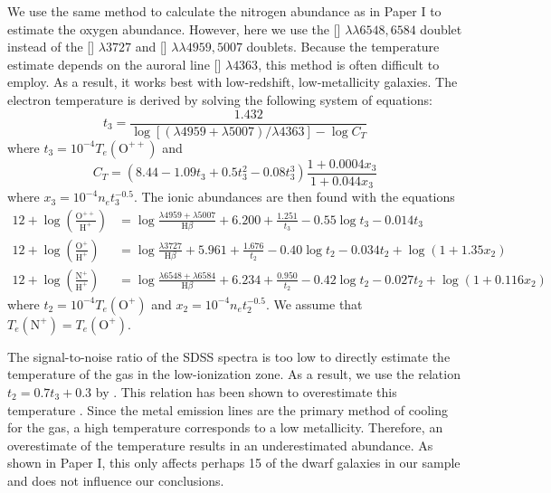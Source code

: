 We use the same method to calculate the nitrogen abundance as in Paper I to 
estimate the oxygen abundance.  However, here we use the [] 
$\lambda \lambda 6548, 6584$ doublet instead of the [] $\lambda 3727$ 
and [] $\lambda \lambda 4959,5007$ doublets.  Because the temperature 
estimate depends on the auroral line [] $\lambda 4363$, this method is 
often difficult to employ.  As a result, it works best with low-redshift, 
low-metallicity galaxies.  The electron temperature is derived by solving the 
following system of equations:
\begin{equation}
	t_3 = \frac{1.432}{\log[(\lambda 4959 + \lambda 5007)/\lambda 4363] - \log C_T}
\end{equation}
where $t_3 = 10^{-4} T_e(\text{O}^{++})$ and
\begin{equation}
	C_T = (8.44 - 1.09t_3 + 0.5t_3^2 - 0.08t_3^3)\frac{1 + 0.0004x_3}{1 + 0.044x_3}
\end{equation}
where $x_3 = 10^{-4} n_e t_3^{-0.5}$.  The ionic abundances are then found with 
the equations
\begin{align}
    12 + \log \left( \frac{\text{O}^{++}}{\text{H}^+} \right) &= \log \frac{\lambda 4959 + \lambda 5007}{\text{H}\beta} + 6.200 + \frac{1.251}{t_3} - 0.55\log t_3 - 0.014t_3 \\
	12 + \log \left( \frac{\text{O}^+}{\text{H}^+} \right) &= \log \frac{\lambda 3727}{\text{H}\beta} + 5.961 + \frac{1.676}{t_2} - 0.40\log t_2 - 0.034t_2 + \log (1+1.35x_2) \\
	12 + \log \left( \frac{\text{N}^+}{\text{H}^+} \right) &= \log \frac{\lambda 6548 + \lambda 6584}{\text{H}\beta} + 6.234 + \frac{0.950}{t_2} - 0.42\log t_2 - 0.027t_2 + \log (1 + 0.116x_2)
\end{align}
where $t_2 = 10^{-4} T_e(\text{O}^+)$ and $x_2 = 10^{-4} n_e t_2^{-0.5}$.  We 
assume that $T_e(\text{N}^+) = T_e(\text{O}^+)$.

The signal-to-noise ratio of the SDSS spectra is too low to directly estimate 
the temperature of the gas in the low-ionization zone.  As a result, we use the 
relation $t_2 = 0.7t_3 + 0.3$ by \cite{Garnett92}.  This relation has been shown 
to overestimate this temperature \citep{Andrews13}.  Since the metal emission 
lines are the primary method of cooling for the gas, a high temperature 
corresponds to a low metallicity.  Therefore, an overestimate of the temperature 
results in an underestimated abundance.  As shown in Paper I, this only affects 
perhaps 15 of the dwarf galaxies in our sample and does not influence our 
conclusions.

